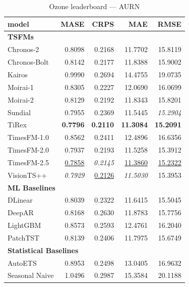 \begin{table}[H]
\caption{Ozone leaderboard --- AURN}
\centering
\begin{small}
\begin{tabular}{lrrrr}
\toprule
model & MASE & CRPS & MAE & RMSE \\
\midrule
\multicolumn{5}{l}{\textbf{TSFMs}} \\
Chronos-2 & 0.8098 & 0.2168 & 11.7702 & 15.8119 \\
Chronos-Bolt & 0.8142 & 0.2177 & 11.8388 & 15.9002 \\
Kairos & 0.9990 & 0.2694 & 14.4755 & 19.0735 \\
Moirai-1 & 0.8305 & 0.2227 & 12.0690 & 16.0699 \\
Moirai-2 & 0.8129 & 0.2192 & 11.8343 & 15.8201 \\
Sundial & 0.7955 & 0.2369 & 11.5445 & \textit{15.2904} \\
TiRex & \textbf{0.7796} & \textbf{0.2110} & \textbf{11.3084} & \textbf{15.2091} \\
TimesFM-1.0 & 0.8562 & 0.2411 & 12.4896 & 16.6356 \\
TimesFM-2.0 & 0.7937 & 0.2193 & 11.5258 & 15.3912 \\
TimesFM-2.5 & \underline{0.7858} & \textit{0.2145} & \underline{11.3860} & \underline{15.2322} \\
VisionTS++ & \textit{0.7929} & \underline{0.2126} & \textit{11.5030} & 15.3953 \\
\midrule
\multicolumn{5}{l}{\textbf{ML Baselines}} \\
DLinear & 0.8039 & 0.2322 & 11.6415 & 15.5045 \\
DeepAR & 0.8168 & 0.2630 & 11.8783 & 15.7756 \\
LightGBM & 0.8573 & 0.2593 & 12.4761 & 16.2040 \\
PatchTST & 0.8139 & 0.2406 & 11.7975 & 15.6749 \\
\midrule
\multicolumn{5}{l}{\textbf{Statistical Baselines}} \\
AutoETS & 0.8953 & 0.2498 & 13.0405 & 16.9632 \\
Seasonal Naive & 1.0496 & 0.2987 & 15.3584 & 20.1188 \\
\bottomrule
\end{tabular}
\end{small}
\end{table}